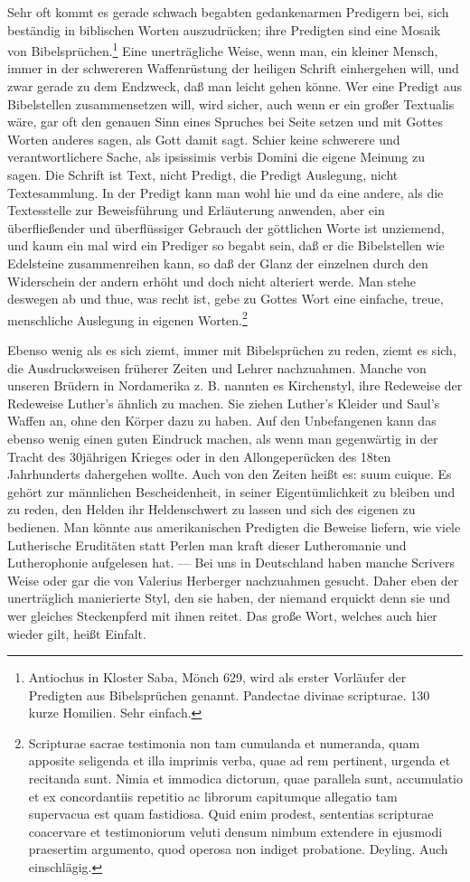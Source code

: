 Sehr oft kommt es gerade schwach begabten gedankenarmen Predigern bei, sich beständig in biblischen Worten auszudrücken; ihre Predigten sind eine Mosaik von Bibelsprüchen.\footnote{Antiochus in Kloster Saba, Mönch 629, wird als erster Vorläufer der Predigten aus Bibelsprüchen genannt. Pandectae divinae scripturae. 130 kurze Homilien. Sehr einfach.} Eine unerträgliche Weise, wenn man, ein kleiner
Mensch, immer in der schwereren Waffenrüstung der heiligen Schrift einhergehen will, und zwar gerade zu dem Endzweck, daß man leicht gehen könne. Wer eine Predigt aus Bibelstellen zusammensetzen will, wird sicher, auch wenn er ein großer Textualis wäre, gar oft den genauen Sinn eines Spruches bei Seite setzen und mit Gottes Worten anderes sagen, als Gott damit sagt. Schier keine schwerere und verantwortlichere Sache, als ipsissimis verbis Domini die eigene Meinung zu sagen. Die Schrift ist Text, nicht Predigt, die Predigt Auslegung, nicht Textesammlung. In der Predigt kann man wohl hie und da eine andere, als die Textesstelle zur Beweisführung und Erläuterung anwenden, aber ein überfließender und überflüssiger Gebrauch der göttlichen Worte ist unziemend, und kaum ein mal wird ein Prediger so begabt sein, daß er die Bibelstellen wie Edelsteine zusammenreihen kann, so daß der Glanz der einzelnen durch den Widerschein der andern erhöht und doch nicht alteriert werde. Man stehe deswegen ab und thue, was recht ist, gebe zu Gottes Wort eine einfache, treue, menschliche Auslegung in eigenen Worten.\footnote{Scripturae sacrae testimonia non tam cumulanda et numeranda, quam apposite seligenda et illa imprimis verba, quae ad rem pertinent, urgenda et recitanda sunt. Nimia et immodica dictorum, quae parallela sunt, accumulatio et ex concordantiis repetitio ac librorum capitumque allegatio tam supervacua est quam fastidiosa. Quid enim prodest, sententias scripturae coacervare et testimoniorum veluti densum nimbum extendere in ejusmodi praesertim argumento, quod operosa non indiget probatione. Deyling. Auch einschlägig.}

Ebenso wenig als es sich ziemt, immer mit Bibelsprüchen zu reden, ziemt es sich, die Ausdrucksweisen früherer Zeiten und Lehrer nachzuahmen. Manche von unseren Brüdern in Nordamerika z. B. nannten es Kirchenstyl, ihre Redeweise der Redeweise Luther’s ähnlich zu machen. Sie ziehen Luther’s Kleider und Saul’s Waffen an, ohne den Körper dazu zu haben. Auf den Unbefangenen kann das ebenso wenig einen guten Eindruck machen, als wenn man gegenwärtig in der Tracht des 30jährigen Krieges oder in den Allongeperücken des 18ten Jahrhunderts dahergehen wollte. Auch von den Zeiten heißt es: suum cuique. Es gehört zur männlichen Bescheidenheit, in seiner Eigentümlichkeit zu bleiben und zu reden, den Helden ihr Heldenschwert zu lassen und sich des eigenen zu bedienen. Man könnte aus amerikanischen Predigten die Beweise liefern, wie viele Lutherische Eruditäten statt Perlen man kraft dieser Lutheromanie und Lutherophonie aufgelesen hat. — Bei uns in Deutschland haben manche Scrivers Weise oder gar die von Valerius Herberger nachzuahmen gesucht. Daher eben der unerträglich manierierte Styl, den sie haben, der niemand erquickt denn sie und wer gleiches Steckenpferd mit ihnen reitet. Das große Wort, welches auch hier wieder gilt, heißt Einfalt.

